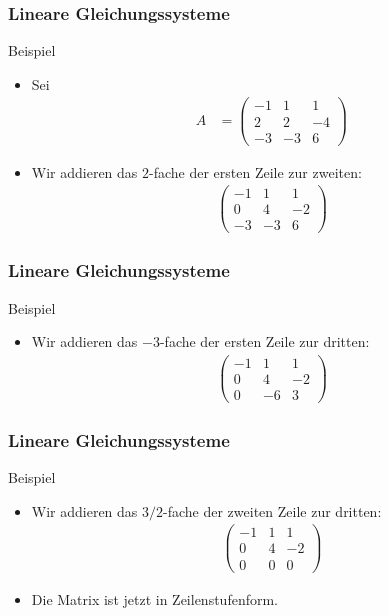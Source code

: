 \documentclass{beamer}
\newcommand{\mytitle}{Lineare Gleichungssysteme}
\begin{document}
\begin{frame}\frametitle{\mytitle}
	\begin{block}{Beispiel}
	\begin{itemize}
		\item Sei
			\begin{align*}
				A&=\begin{pmatrix}
					-1&1&1\\2&2&-4\\-3&-3&6
				\end{pmatrix}
			\end{align*}
		\item Wir addieren das $2$-fache der ersten Zeile zur zweiten:
\begin{align*}
				\begin{pmatrix}
					-1&1&1\\0&4&-2\\-3&-3&6
				\end{pmatrix}
			\end{align*}
	\end{itemize}
	\end{block}
\end{frame}

\begin{frame}\frametitle{\mytitle}
	\begin{block}{Beispiel}
	\begin{itemize}
		\item Wir addieren das $-3$-fache der ersten Zeile zur dritten:
\begin{align*}
				\begin{pmatrix}
					-1&1&1\\0&4&-2\\0&-6&3
				\end{pmatrix}
			\end{align*}
	\end{itemize}
	\end{block}
\end{frame}

\begin{frame}\frametitle{\mytitle}
	\begin{block}{Beispiel}
	\begin{itemize}
		\item Wir addieren das $3/2$-fache der zweiten Zeile zur dritten:
\begin{align*}
				\begin{pmatrix}
					-1&1&1\\0&4&-2\\0&0&0
				\end{pmatrix}
			\end{align*}
		\item Die Matrix ist jetzt in Zeilenstufenform.
	\end{itemize}
	\end{block}
\end{frame}
\end{document}
